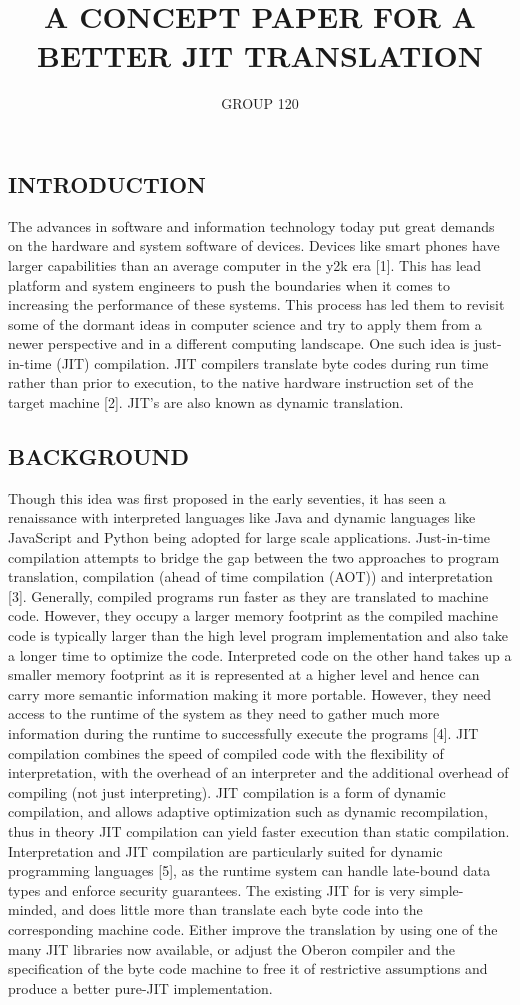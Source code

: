 \documentclass{article}
\begin{document}
\title{A CONCEPT PAPER FOR A BETTER JIT TRANSLATION}
\author{GROUP 120 }
\maketitle
\tableofcontents
\subsection{INTRODUCTION }{The advances in software and information technology today put great demands on the hardware and system software of devices. Devices like smart phones have larger capabilities than an average computer in the y2k era [1]. This has lead platform and system engineers to push the boundaries when it comes to increasing the performance of these systems. This process has led them to revisit some of the dormant ideas in computer science and try to apply them from a newer perspective and in a different computing landscape. One such idea is just-in-time (JIT) compilation. JIT compilers translate byte codes during run time rather than prior to execution, to the native hardware instruction set of the target machine [2]. JIT’s are also known as dynamic translation.
}
\subsection {BACKGROUND}{Though this idea was first proposed in the early seventies, it has seen a renaissance with interpreted languages like Java and dynamic languages like JavaScript and Python being adopted for large scale applications.
 Just-in-time compilation attempts to bridge the gap between the two approaches to program translation, compilation (ahead of time compilation (AOT)) and interpretation [3]. Generally, compiled programs run faster as they are translated to machine code. However, they occupy a larger memory footprint as the compiled machine code is typically larger than the high level program implementation and also take a longer time to optimize the code. Interpreted code on the other hand takes up a smaller memory footprint as it is represented at a higher level and hence can carry more semantic information making it more portable. However, they need access to the runtime of the system as they need to gather much more information during the runtime to successfully execute the programs [4]. 
JIT compilation combines the speed of compiled code with the flexibility of interpretation, with the overhead of an interpreter and the additional overhead of compiling (not just interpreting). JIT compilation is a form of dynamic compilation, and allows adaptive optimization such as dynamic recompilation, thus in theory JIT compilation can yield faster execution than static compilation. Interpretation and JIT compilation are particularly suited for dynamic programming languages [5], as the runtime system can handle late-bound data types and enforce security guarantees. The existing JIT for is very simple-minded, and does little more than translate each byte code into the corresponding machine code. Either improve the translation by using one of the many JIT libraries now available, or adjust the Oberon compiler and the specification of the byte code machine to free it of restrictive assumptions and produce a better pure-JIT implementation.}
\end{document}
